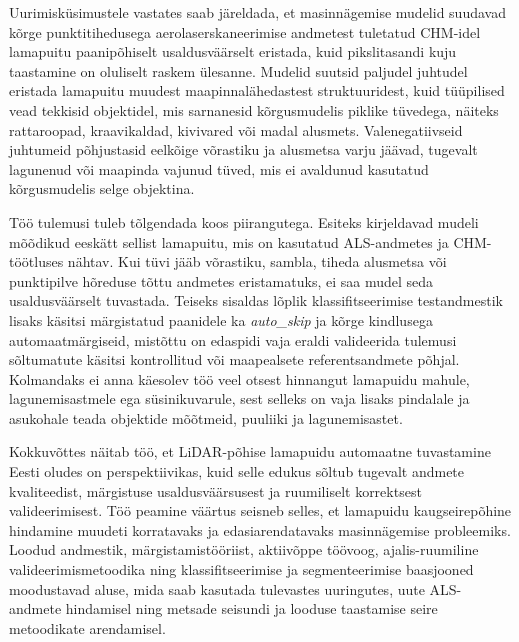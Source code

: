 Uurimisküsimustele vastates saab järeldada, et masinnägemise mudelid suudavad kõrge punktitihedusega aerolaserskaneerimise andmetest tuletatud CHM-idel lamapuitu paanipõhiselt usaldusväärselt eristada, kuid pikslitasandi kuju taastamine on oluliselt raskem ülesanne. Mudelid suutsid paljudel juhtudel eristada lamapuitu muudest maapinnalähedastest struktuuridest, kuid tüüpilised vead tekkisid objektidel, mis sarnanesid kõrgusmudelis piklike tüvedega, näiteks rattaroopad, kraavikaldad, kivivared või madal alusmets. Valenegatiivseid juhtumeid põhjustasid eelkõige võrastiku ja alusmetsa varju jäävad, tugevalt lagunenud või maapinda vajunud tüved, mis ei avaldunud kasutatud kõrgusmudelis selge objektina.

Töö tulemusi tuleb tõlgendada koos piirangutega. Esiteks kirjeldavad mudeli mõõdikud eeskätt sellist lamapuitu, mis on kasutatud ALS-andmetes ja CHM-töötluses nähtav. Kui tüvi jääb võrastiku, sambla, tiheda alusmetsa või punktipilve hõreduse tõttu andmetes eristamatuks, ei saa mudel seda usaldusväärselt tuvastada. Teiseks sisaldas lõplik klassifitseerimise testandmestik lisaks käsitsi märgistatud paanidele ka \textit{auto\_skip} ja kõrge kindlusega automaatmärgiseid, mistõttu on edaspidi vaja eraldi valideerida tulemusi sõltumatute käsitsi kontrollitud või maapealsete referentsandmete põhjal. Kolmandaks ei anna käesolev töö veel otsest hinnangut lamapuidu mahule, lagunemisastmele ega süsinikuvarule, sest selleks on vaja lisaks pindalale ja asukohale teada objektide mõõtmeid, puuliiki ja lagunemisastet.

Kokkuvõttes näitab töö, et LiDAR-põhise lamapuidu automaatne tuvastamine Eesti oludes on perspektiivikas, kuid selle edukus sõltub tugevalt andmete kvaliteedist, märgistuse usaldusväärsusest ja ruumiliselt korrektsest valideerimisest. Töö peamine väärtus seisneb selles, et lamapuidu kaugseirepõhine hindamine muudeti korratavaks ja edasiarendatavaks masinnägemise probleemiks. Loodud andmestik, märgistamistööriist, aktiivõppe töövoog, ajalis-ruumiline valideerimismetoodika ning klassifitseerimise ja segmenteerimise baasjooned moodustavad aluse, mida saab kasutada tulevastes uuringutes, uute ALS-andmete hindamisel ning metsade seisundi ja looduse taastamise seire metoodikate arendamisel.

\newpage
